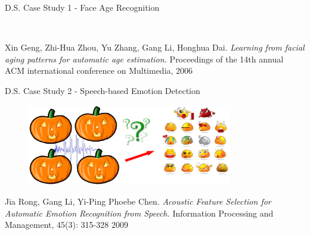 \documentclass[
 size=14pt,
 paper=smartboard,  %
 mode=present, 		%
 display=slides, 	%
 style=tuliplab,  	%
 pauseslide,
 fleqn,leqno]{powerdot}
\begin{document}
\begin{slide}[toc=,bm=]{D.S. Case Study 1 - Face Age Recognition}

\begin{figure}[htbp]
    \\
\end{figure}

\footnotesize{Xin Geng, Zhi-Hua Zhou, Yu Zhang, Gang Li, Honghua Dai.
\emph{Learning from facial aging patterns for automatic age estimation. }
Proceedings of the 14th annual ACM international conference on Multimedia, 2006}

\end{slide}


\begin{slide}[toc=,bm=]{D.S. Case Study 2 - Speech-based Emotion Detection}

\begin{figure}
  \includegraphics[width=0.8\textwidth]{figures//theme1//Theme1_22.eps}
\end{figure}

\footnotesize{Jia Rong, Gang Li, Yi-Ping Phoebe Chen.
\emph{Acoustic Feature Selection for Automatic Emotion Recognition from Speech. }
Information Processing and Management, 45(3):  315-328 2009
}

\end{slide}
\end{document}
